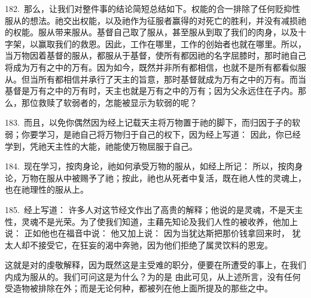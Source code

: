 \par

182.~那么，让我们对整件事的结论简短总结如下。权能的合一排除了任何贬抑性服从的想法。祂交出权能，以及祂作为征服者赢得的对死亡的胜利，并没有减损祂的权能。服从带来服从。基督自己取了服从，甚至服从到取了我们的肉身，以及十字架，以赢取我们的救恩。因此，工作在哪里，工作的创始者也就在哪里。所以，当万物因着基督的服从，都服从于基督，使所有都因祂的名字屈膝时，那时祂自己将成为万有之中的万有。因为如今，既然并非所有都相信，也就不是所有都看似服从。但当所有都相信并承行了天主的旨意，那时基督就成为万有之中的万有。而当基督是万有之中的万有时，天主也就是万有之中的万有；因为父永远住在子内。那么，那位救赎了软弱者的，怎能被显示为软弱的呢？\par

183.~而且，以免你偶然因为经上记载天主将万物置于祂的脚下，而归因于子的软弱；你要学习，是祂自己将万物归于自己的权下，因为经上写道： 因此，你已经学到，凭祂天主性的大能，祂能使万物屈服于自己。\par

184.~现在学习，按肉身论，祂如何承受万物的服从，如经上所记： 所以，按肉身论，万物在服从中被赐予了祂；按此，祂也从死者中复活，既在祂人性的灵魂上，也在祂理性的服从上。\par

185.~经上写道： 许多人对这节经文作出了高贵的解释；他说的是灵魂，不是天主性，灵魂不是光荣。为了使我们知道，主藉先知论及我们人性的被收养，他加上说： 正如他也在福音中说： 他又加上说： 因为当犹达斯把那价钱拿回来时， 犹太人却不接受它，在狂妄的渴中奔驰，因为他们拒绝了属灵饮料的恩宠。\par

这就是对的虔敬解释，因为既然这是主受难的职分，便要在所遭受的事上，在我们内成为服从的。我们可问这是为什么？为的是 由此可见，从上述所言，没有任何受造物被排除在外；而是无论何种，都被列在他上面所提及的那些之中。\par

